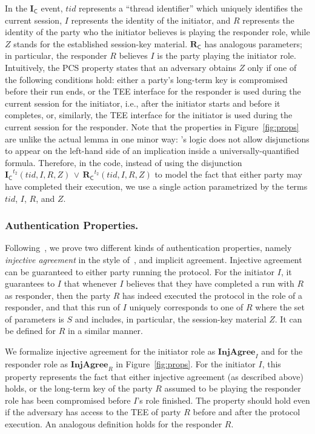 \documentclass[runningheads]{llncs}
\newcommand{\mFunStyle}[1]{\textsf{#1}}
\newcommand{\mProtocolStyle}[1]{\text{#1}}
\newcommand{\mIComplete}{\ensuremath{\mathbf{I}_\mFunStyle{C}}}
\newcommand{\mRComplete}{\ensuremath{\mathbf{R}_\mFunStyle{C}}}
\newcommand{\mPredInjI}{\ensuremath{\mathbf{InjAgree}_I}}
\newcommand{\mPredInjR}{\ensuremath{\mathbf{InjAgree}_R}}
\newcommand{\mTamarin}{\mProtocolStyle{Tamarin}}
\newcommand{\mSessKey}{\ensuremath{Z}}
\newcommand{\mTID}{\ensuremath{\mathit{tid}}}
\begin{document}
In the \mIComplete{} event, \mTID{} represents a ``thread identifier'' which uniquely identifies the
current session, $I$ represents the identity of the initiator,
and $R$ represents the identity of the party who the initiator believes is
playing the responder role, while \mSessKey{} stands for the established
session-key material.
%
\mRComplete{} has analogous parameters; in particular, the responder $R$
believes $I$ is the party playing the initiator role.
%
Intuitively, the PCS property states that an adversary obtains \mSessKey{}
only if one of the following conditions hold: either a party's long-term key
is compromised before their run ends, or the TEE interface for the responder is used during the current
session for the initiator, i.e., after the initiator starts and before it
completes, or, similarly, the TEE interface for the initiator is used during the
current session for the responder.
%
Note that the properties in Figure~\ref{fig:props} are unlike the actual \mTamarin{} lemma in one minor way: \mTamarin's logic does not allow disjunctions to appear on
the left-hand side of an implication inside a universally-quantified formula.
%
Therefore, in the \mTamarin{} code, instead of using the disjunction
$\mIComplete^{t_2}(\mTID, I, R, \mSessKey)\, \lor\,
\mRComplete^{t_2}(\mTID, I, R, \mSessKey)$
to model the fact that either party may have completed their execution, we use
a single action parametrized by the terms $\mTID$, $I$, $R$, and \mSessKey.

\subsubsection{Authentication Properties.}
\label{sec:authenticationDef}
Following~\cite{Norr21}, we prove two different kinds of authentication
properties, namely \emph{injective agreement} in the style
of~\cite{DBLP:conf/csfw/Lowe97a}, and implicit agreement.
%
Injective agreement can be guaranteed to either party running the protocol.
%
For the initiator $I$, it guarantees to $I$ that whenever $I$ believes that
they have completed a run with $R$ as responder, then the party $R$ has 
indeed
executed the protocol in the role of a responder, and that this run of $I$
uniquely corresponds to one of $R$ where the set of parameters is $S$ and
includes, in particular, the session-key material \mSessKey{}.
%
It can be defined for $R$ in a similar manner.

%
We formalize injective agreement for the initiator role as \mPredInjI{} and
for the responder role as \mPredInjR{} in Figure~\ref{fig:props}.
%
For the initiator $I$, this property represents the fact that either
injective agreement (as described above) holds, or the long-term key of
the party $R$ assumed to be playing the responder role has been
compromised before $I$'s role finished.
%
The property should hold even if the adversary has access to the TEE of party 
$R$
before and after the protocol execution.
An analogous definition holds for the responder $R$.
%
\end{document}
